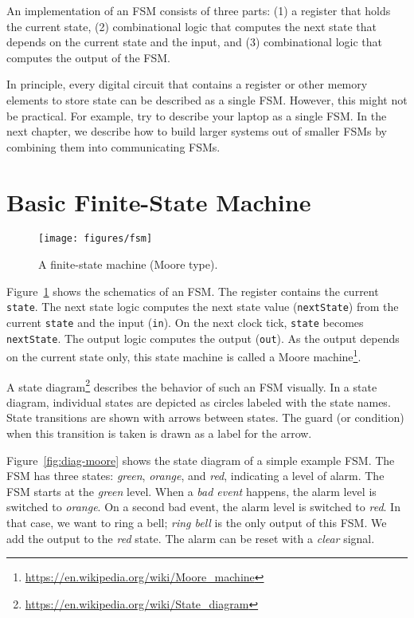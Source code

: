 \documentclass[%
    10pt,
    headinclude, footexclude,
    openright, %
    notitlepage,
    cleardoubleempty,
    headsepline,
    pointlessnumbers,
    bibtotoc, idxtotoc,
    ]{scrbook}
\newcommand{\scale}{0.7}
\newcommand{\code}[1]{{\lstinline[basicstyle=\small\ttfamily]{#1}}}
\newcommand{\myref}[2]{\href{#1}{#2}}
\renewcommand{\myref}[2]{{#2}{\footnote{\url{#1}}}}
\begin{document}
An implementation of an FSM consists of three parts: (1) a register that holds the current state,
(2) combinational logic that computes the next state that depends on the current
state and the input, and (3) combinational logic that computes the output of the FSM.

In principle, every digital circuit that contains a register or other memory elements
to store state can be described as a single FSM. However, this might
not be practical. For example, try to describe your laptop as a single FSM.
In the next chapter, we describe how to build larger systems
out of smaller FSMs by combining them into communicating FSMs.

\section{Basic Finite-State Machine}

\begin{figure}
  \centering
  \texttt{[image: figures/fsm]} %
  \caption{A finite-state machine (Moore type).}
  \label{fig:fsm}
\end{figure}

Figure~\ref{fig:fsm} shows the schematics of an FSM. The register contains the current \code{state}.
The next state logic computes the next state value (\code{nextState})
from the current \code{state} and the input (\code{in}).
On the next clock tick, \code{state} becomes \code{nextState}.
The output logic computes the output (\code{out}). As the output depends on the current
state only, this state machine is called a
\myref{https://en.wikipedia.org/wiki/Moore_machine}{Moore machine}.


A \myref{https://en.wikipedia.org/wiki/State_diagram}{state diagram}
describes the behavior of such an FSM visually.
In a state diagram, individual states are depicted as circles labeled
with the state names.
State transitions are shown with arrows between states.
The guard (or condition) when this transition is taken is drawn as a label
for the arrow.

Figure~\ref{fig:diag-moore} shows the state diagram of a simple example FSM.
The FSM has three states: \emph{green}, \emph{orange}, and \emph{red},
indicating a level of alarm. The FSM starts at the \emph{green} level.
When a \emph{bad event} happens, the alarm level is switched to \emph{orange}.
On a second bad event, the alarm level is switched to \emph{red}.
In that case, we want to ring a bell; \emph{ring bell} is the only output of this FSM.
We add the output to the \emph{red} state.
The alarm can be reset with a \emph{clear} signal.
\end{document}
